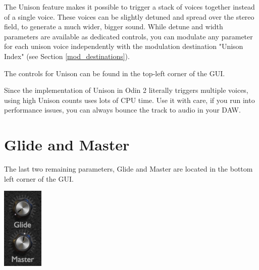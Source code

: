 The Unison feature makes it possible to trigger a stack of voices together instead of a single voice. These voices can be slightly detuned and spread over the stereo field, to generate a much wider, bigger sound. While detune and width parameters are available as dedicated controls, you can modulate any parameter for each unison voice independently with the modulation destination "Unison Index" (see Section \ref{mod_destinations}).

\vspace{3mm}
The controls for Unison can be found in the top-left corner of the GUI.

\vspace{3mm}
\begin{tcolorbox}[colback=yellow!10!white,
        colframe=white!20!black,
        center,
        valign=top,
        halign=left,
        center title,
        width=\textwidth]

    Since the implementation of Unison in Odin 2 literally triggers multiple voices, using high Unison counts uses lots of CPU time. Use it with care, if you run into performance issues, you can always bounce the track to audio in your DAW.
\end{tcolorbox}




\section{Glide and Master}
\label{glide}

The last two remaining parameters, Glide and Master are located in the bottom left corner of the GUI.

\begin{center}
    \includegraphics[height=0.2\textwidth]{graphics/master_glide.png}
\end{center}


